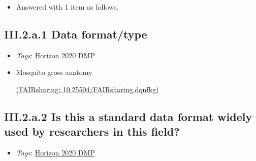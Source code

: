 \documentclass[a4paper,12pt]{report}
\begin{document}
\begin{itemize}
  \item[\ArrowBoldDownRight] Answered with 1 item as follows.
\end{itemize}%
\subsection*{\protect\textcolor{colorSecId}{III.2.a.1} Data format/type}

\label{b1df3c74-0b1f-4574-81c4-4cc2d780c1af.b08fe063-33f8-4380-b3a9-ba1e586dedf2.df7ff410-748e-4704-b5b4-a06c4b269047.f00cf643-5368-458a-97d4-b463c2000c66}


\begin{itemize}
  \item \textit{Tags}: \ul{Horizon 2020 DMP}
  \end{itemize}




\begin{itemize}
  \item[\CheckmarkBold]
  \begin{markdown}
  Mosquito gross anatomy
  \end{markdown}
  \href{https://fairsharing.org/10.25504/FAIRsharing.dqnfkg}{(FAIRsharing: 10.25504/FAIRsharing.dqnfkg)}
  
\end{itemize}


\subsection*{\protect\textcolor{colorSecId}{III.2.a.2} Is this a standard data format widely used by researchers in this field?}

\label{b1df3c74-0b1f-4574-81c4-4cc2d780c1af.b08fe063-33f8-4380-b3a9-ba1e586dedf2.df7ff410-748e-4704-b5b4-a06c4b269047.ecff019a-d4e6-44c6-a8fe-c84eb15ed8b7}


\begin{itemize}
  \item \textit{Tags}: \ul{Horizon 2020 DMP}
  \end{itemize}
\end{document}
